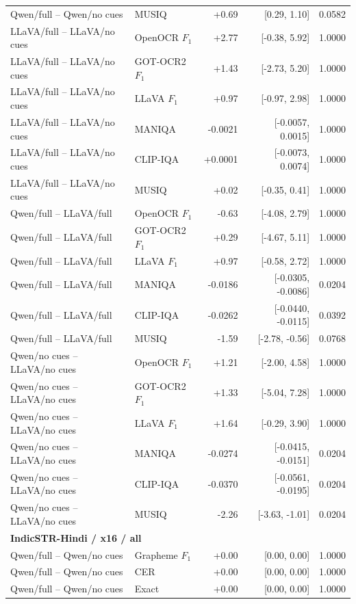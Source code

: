 \begin{longtable}{llrrr}
Qwen/full -- Qwen/no cues & MUSIQ & +0.69 & [0.29, 1.10] & 0.0582 \\
LLaVA/full -- LLaVA/no cues & OpenOCR $F_1$ & +2.77 & [-0.38, 5.92] & 1.0000 \\
LLaVA/full -- LLaVA/no cues & GOT-OCR2 $F_1$ & +1.43 & [-2.73, 5.20] & 1.0000 \\
LLaVA/full -- LLaVA/no cues & LLaVA $F_1$ & +0.97 & [-0.97, 2.98] & 1.0000 \\
LLaVA/full -- LLaVA/no cues & MANIQA & -0.0021 & [-0.0057, 0.0015] & 1.0000 \\
LLaVA/full -- LLaVA/no cues & CLIP-IQA & +0.0001 & [-0.0073, 0.0074] & 1.0000 \\
LLaVA/full -- LLaVA/no cues & MUSIQ & +0.02 & [-0.35, 0.41] & 1.0000 \\
Qwen/full -- LLaVA/full & OpenOCR $F_1$ & -0.63 & [-4.08, 2.79] & 1.0000 \\
Qwen/full -- LLaVA/full & GOT-OCR2 $F_1$ & +0.29 & [-4.67, 5.11] & 1.0000 \\
Qwen/full -- LLaVA/full & LLaVA $F_1$ & +0.97 & [-0.58, 2.72] & 1.0000 \\
Qwen/full -- LLaVA/full & MANIQA & -0.0186 & [-0.0305, -0.0086] & 0.0204 \\
Qwen/full -- LLaVA/full & CLIP-IQA & -0.0262 & [-0.0440, -0.0115] & 0.0392 \\
Qwen/full -- LLaVA/full & MUSIQ & -1.59 & [-2.78, -0.56] & 0.0768 \\
Qwen/no cues -- LLaVA/no cues & OpenOCR $F_1$ & +1.21 & [-2.00, 4.58] & 1.0000 \\
Qwen/no cues -- LLaVA/no cues & GOT-OCR2 $F_1$ & +1.33 & [-5.04, 7.28] & 1.0000 \\
Qwen/no cues -- LLaVA/no cues & LLaVA $F_1$ & +1.64 & [-0.29, 3.90] & 1.0000 \\
Qwen/no cues -- LLaVA/no cues & MANIQA & -0.0274 & [-0.0415, -0.0151] & 0.0204 \\
Qwen/no cues -- LLaVA/no cues & CLIP-IQA & -0.0370 & [-0.0561, -0.0195] & 0.0204 \\
Qwen/no cues -- LLaVA/no cues & MUSIQ & -2.26 & [-3.63, -1.01] & 0.0204 \\
\midrule
\multicolumn{5}{l}{\textbf{IndicSTR-Hindi / x16 / all}}\\
\midrule
Qwen/full -- Qwen/no cues & Grapheme $F_1$ & +0.00 & [0.00, 0.00] & 1.0000 \\
Qwen/full -- Qwen/no cues & CER & +0.00 & [0.00, 0.00] & 1.0000 \\
Qwen/full -- Qwen/no cues & Exact & +0.00 & [0.00, 0.00] & 1.0000 \\

\end{longtable}
